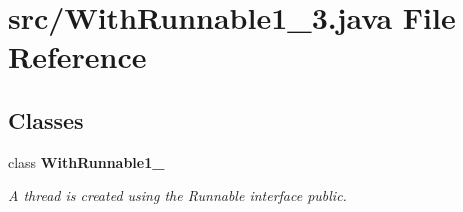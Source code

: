 \section{src/\+With\+Runnable1\+\_\+3.java File Reference}
\label{_with_runnable1__3_8java}
\subsection*{Classes}
\begin{DoxyCompactItemize}
\item 
class {\bf With\+Runnable1\+\_}
\begin{DoxyCompactList}\small\item\em A thread is created using the Runnable interface  public. \end{DoxyCompactList}\end{DoxyCompactItemize}
